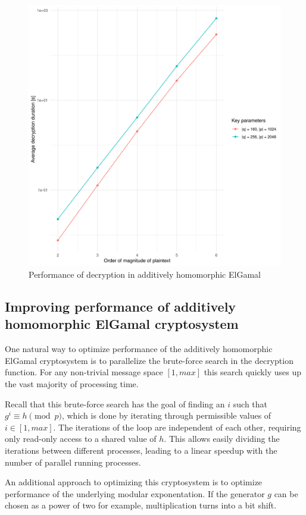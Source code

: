\documentclass[a4paper]{scrreprt}
\begin{document}
\begin{figure}[h]
        \centering
		\includegraphics[width=\textwidth]{elgamal_performance}
		\caption{Performance of decryption in additively homomorphic ElGamal}
		\label{fig:performance}
\end{figure}

\subsection{Improving performance of additively homomorphic ElGamal cryptosystem}

One natural way to optimize performance of the additively homomorphic ElGamal
cryptosystem is to parallelize the brute-force search in the decryption
function. For any non-trivial message space $[1, max]$ this search quickly uses
up the vast majority of processing time.

Recall that this brute-force search has the goal of finding an $i$ such that
$g^i \equiv h \pmod{p}$, which is done by iterating through permissible values
of $i \in [1, max]$. The iterations of the loop are independent of each other,
requiring only read-only access to a shared value of $h$. This allows easily
dividing the iterations between different processes, leading to a linear
speedup with the number of parallel running processes.

An additional approach to optimizing this cryptosystem is to optimize
performance of the underlying modular exponentation. If the generator $g$ can
be chosen as a power of two for example, multiplication turns into a bit shift.
\end{document}

